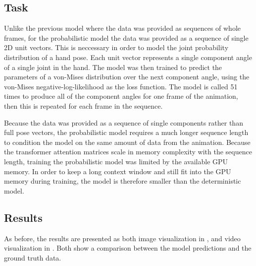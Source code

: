 \subsection{Task}

Unlike the previous model where the data was provided as sequences of whole frames, for the probabilistic model the data was provided as a sequence of single 2D unit vectors. This is neccessary in order to model the joint probability distribution of a hand pose. Each unit vector represents a single component angle of a single joint in the hand. The model was then trained to predict the parameters of a von-Mises distribution over the next component angle, using the von-Mises negative-log-likelihood as the loss function. The model is called 51 times to produce all of the component angles for one frame of the animation, then this is repeated for each frame in the sequence.

Because the data was provided as a sequence of single components rather than full pose vectors, the probabilistic model requires a much longer sequence length to condition the model on the same amount of data from the animation. Because the transformer attention matrices scale in memory complexity with the sequence length, training the probabilistic model was limited by the available GPU memory. In order to keep a long context window and still fit into the GPU memory during training, the model is therefore smaller than the deterministic model.

\subsection{Results}
\label{ss:prob-model-results}

As before, the results are presented as both image visualization in , and video visualization in . Both show a comparison between the model predictions and the ground truth data.


